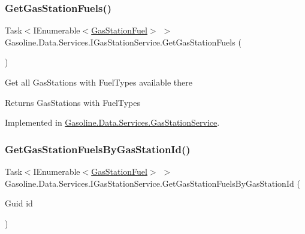\mbox{\label{interface_gasoline_1_1_data_1_1_services_1_1_i_gas_station_service_a6ce56950a33e26aa14da2e8b1b92948b}} 
\subsubsection{\texorpdfstring{GetGasStationFuels()}{GetGasStationFuels()}}
{\footnotesize\ttfamily Task$<$I\+Enumerable$<$\mbox{\hyperlink{class_gasoline_1_1_data_1_1_models_1_1_gas_station_fuel}{Gas\+Station\+Fuel}}$>$ $>$ Gasoline.\+Data.\+Services.\+I\+Gas\+Station\+Service.\+Get\+Gas\+Station\+Fuels (\begin{DoxyParamCaption}{ }\end{DoxyParamCaption})}



Get all Gas\+Stations with Fuel\+Types available there 

\begin{DoxyReturn}{Returns}
Gas\+Stations with Fuel\+Types
\end{DoxyReturn}


Implemented in \mbox{\hyperlink{class_gasoline_1_1_data_1_1_services_1_1_gas_station_service_a1b190190220d302d763a55ce77e7de50}{Gasoline.\+Data.\+Services.\+Gas\+Station\+Service}}.

\mbox{\label{interface_gasoline_1_1_data_1_1_services_1_1_i_gas_station_service_a6e69c73a645741984d2dc56cdd1a835c}} 
\subsubsection{\texorpdfstring{GetGasStationFuelsByGasStationId()}{GetGasStationFuelsByGasStationId()}}
{\footnotesize\ttfamily Task$<$I\+Enumerable$<$\mbox{\hyperlink{class_gasoline_1_1_data_1_1_models_1_1_gas_station_fuel}{Gas\+Station\+Fuel}}$>$ $>$ Gasoline.\+Data.\+Services.\+I\+Gas\+Station\+Service.\+Get\+Gas\+Station\+Fuels\+By\+Gas\+Station\+Id (\begin{DoxyParamCaption}\item[{Guid}]{id }\end{DoxyParamCaption})}



